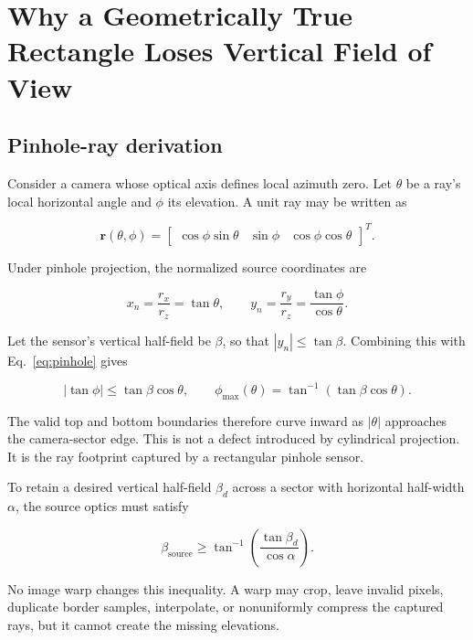 \documentclass[10pt]{article}
\begin{document}
\section{Why a Geometrically True Rectangle Loses Vertical Field of View}

\subsection{Pinhole-ray derivation}

Consider a camera whose optical axis defines local azimuth zero. Let $\theta$ be a ray's local horizontal angle and $\phi$ its elevation. A unit ray may be written as

\begin{equation}
\mathbf r(\theta,\phi)=
\begin{bmatrix}
\cos\phi\sin\theta & \sin\phi & \cos\phi\cos\theta
\end{bmatrix}^{\!T}.
\end{equation}

Under pinhole projection, the normalized source coordinates are

\begin{equation}
x_n=\frac{r_x}{r_z}=\tan\theta,
\qquad
y_n=\frac{r_y}{r_z}=\frac{\tan\phi}{\cos\theta}.
\label{eq:pinhole}
\end{equation}

Let the sensor's vertical half-field be $\beta$, so that $|y_n|\le\tan\beta$. Combining this with Eq.~\eqref{eq:pinhole} gives

\begin{equation}
|\tan\phi|\le\tan\beta\cos\theta,
\qquad
\phi_{\max}(\theta)=\tan^{-1}\!\left(\tan\beta\cos\theta\right).
\label{eq:phimax}
\end{equation}

The valid top and bottom boundaries therefore curve inward as $|\theta|$ approaches the camera-sector edge. This is not a defect introduced by cylindrical projection. It is the ray footprint captured by a rectangular pinhole sensor.

To retain a desired vertical half-field $\beta_d$ across a sector with horizontal half-width $\alpha$, the source optics must satisfy

\begin{equation}
\beta_{\mathrm{source}}
\ge
\tan^{-1}\!\left(\frac{\tan\beta_d}{\cos\alpha}\right).
\label{eq:requiredvfov}
\end{equation}

No image warp changes this inequality. A warp may crop, leave invalid pixels, duplicate border samples, interpolate, or nonuniformly compress the captured rays, but it cannot create the missing elevations.
\end{document}

